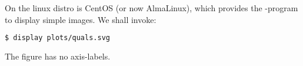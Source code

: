 \begin{frame}[fragile]
  \frametitle{}
  On \mogon{} the linux distro is CentOS (or now AlmaLinux), which provides the -program to display simple images. We shall invoke:
  \begin{lstlisting}[language=Bash, style=Shell]
$ display plots/quals.svg
  \end{lstlisting}
  The figure has no axis-labels.
\end{frame}
